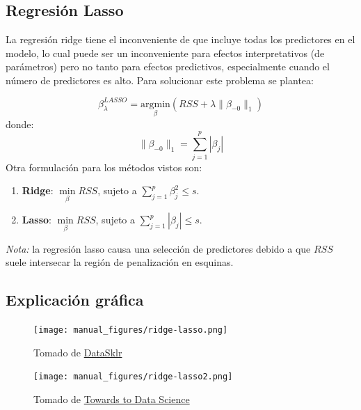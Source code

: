 \documentclass[
  12pt,
]{book}
\providecommand{\tightlist}{%
  \setlength{\itemsep}{0pt}\setlength{\parskip}{0pt}}
\begin{document}
\hypertarget{regresiuxf3n-lasso}{%
\subsection{Regresión Lasso}\label{regresiuxf3n-lasso}}

La regresión ridge tiene el inconveniente de que incluye todas los
predictores en el modelo, lo cual puede ser un inconveniente para
efectos interpretativos (de parámetros) pero no tanto para efectos
predictivos, especialmente cuando el número de predictores es alto. Para
solucionar este problema se plantea:

\[ \beta_{\lambda}^{LASSO} = \underset{\beta}{\mathrm{argmin}}\left(RSS + \lambda\|\beta_{-0}\|_1 \right)\]
donde: \[ \|\beta_{-0}\|_1 = \sum_{j=1}^p|\beta_j|\] Otra formulación
para los métodos vistos son:

\begin{enumerate}
\def\labelenumi{\arabic{enumi}.}
\tightlist
\item
  \textbf{Ridge}: \(\underset{\beta}{\min} RSS\), sujeto a
  \(\displaystyle\sum_{j=1}^p\beta_j^2 \leq s\).
\item
  \textbf{Lasso}: \(\underset{\beta}{\min} RSS\), sujeto a
  \(\displaystyle\sum_{j=1}^p|\beta_j| \leq s\).
\end{enumerate}

\emph{Nota:} la regresión lasso causa una selección de predictores
debido a que \(RSS\) suele intersecar la región de penalización en
esquinas.

\hypertarget{explicaciuxf3n-gruxe1fica}{%
\subsection{Explicación gráfica}\label{explicaciuxf3n-gruxe1fica}}

\begin{figure}
\centering
\texttt{[image: manual\_figures/ridge-lasso.png]}
\caption{Tomado de
\href{https://www.datasklr.com/extensions-of-ols-regression/regularization-and-shrinkage-ridge-lasso-and-elastic-net-regression}{DataSklr}}
\end{figure}

\begin{figure}
\centering
\texttt{[image: manual\_figures/ridge-lasso2.png]}
\caption{Tomado de
\href{https://towardsdatascience.com/regularization-in-machine-learning-connecting-the-dots-c6e030bfaddd}{Towards
to Data Science}}
\end{figure}
\end{document}
